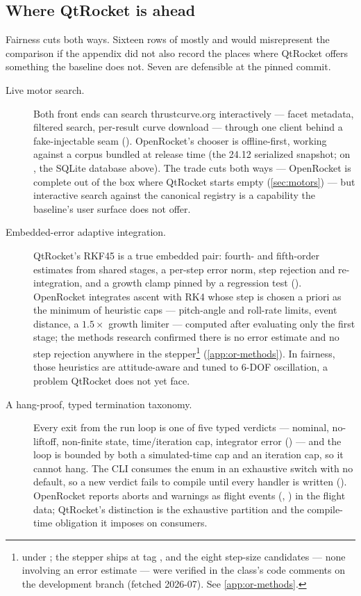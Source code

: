 \subsection{Where QtRocket is ahead}\label{app:or-features-ahead}

Fairness cuts both ways. Sixteen rows of mostly \fpartial{} and \fabsent{} would misrepresent
the comparison if the appendix did not also record the places where QtRocket offers something
the baseline does not. Seven are defensible at the pinned commit.

\begin{description}
\item[Live motor search.] Both front ends can search thrustcurve.org interactively --- facet
metadata, filtered search, per-result curve download --- through one client behind a
fake-injectable seam (). OpenRocket's chooser is
offline-first, working against a corpus bundled at release time (the 24.12 serialized snapshot;
on , the SQLite database above). The trade cuts both ways --- OpenRocket is
complete out of the box where QtRocket starts empty (\cref{sec:motors}) --- but interactive
search against the canonical registry is a capability the baseline's user surface does not
offer.

\item[Embedded-error adaptive integration.] QtRocket's RKF45 is a true embedded pair: fourth-
and fifth-order estimates from shared stages, a per-step error norm, step rejection and
re-integration, and a growth clamp pinned by a regression test ().
OpenRocket integrates ascent with RK4 whose step is chosen a priori as the minimum of heuristic
caps --- pitch-angle and roll-rate limits, event distance, a $1.5\times$ growth limiter ---
computed after evaluating only the first stage; the methods research confirmed there is no error
estimate and no step rejection anywhere in the stepper\footnote{
under ; the stepper ships at tag
, and the eight step-size candidates --- none involving an error
estimate --- were verified in the class's code comments on the  development
branch (fetched 2026-07). See \cref{app:or-methods}.} (\cref{app:or-methods}). In fairness, those heuristics are
attitude-aware and tuned to 6-DOF oscillation, a problem QtRocket does not yet face.

\item[A hang-proof, typed termination taxonomy.] Every exit from the run loop is one of five
typed verdicts --- nominal, no-liftoff, non-finite state, time/iteration cap, integrator error
() --- and the loop is bounded by both a simulated-time cap and an
iteration cap, so it cannot hang. The CLI consumes the enum in an exhaustive switch with no
default, so a new verdict fails to compile until every handler is written
(). OpenRocket reports aborts and warnings as flight events
(, ) in the flight data; QtRocket's distinction is the
exhaustive partition and the compile-time obligation it imposes on consumers.


\end{description}

